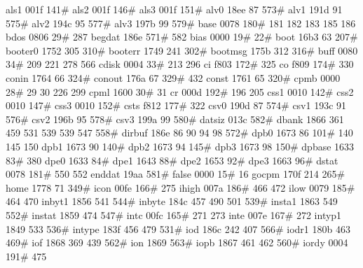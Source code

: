 als1            001f    141#
als2            001f    146#
als3            001f    151#
alv0            18ee     87     573#
alv1            191d     91     575#
alv2            194c     95     577#
alv3            197b     99     579#
base            0078    180#    181     182     183    185    186
bdos            0806     29#    287 
begdat          186e    571#    582
bias            0000     19#     22#
boot            16b3     63     207#
booter0         1752    305     310#
booterr         1749    241     302#
bootmsg         175b    312     316#
buff            0080     34#    209     221     278     566
cdisk           0004     33#    213     296
ci              f803    172#    325
co              f809    174#    330
conin           1764     66     324#
conout          176a     67     329#    432
const           1761     65     320#
cpmb            0000     28#     29      30     226     299
cpml            1600     30#     31
cr              000d    192#    196     205
css1            0010    142#
css2            0010    147#
css3            0010    152#
csts            f812    177#    322
csv0            190d     87     574#
csv1            193c     91     576#
csv2            196b     95     578#
csv3            199a     99     580#
datsiz          013c    582#
dbank           1866    361     459     531     539     539     547     558#
dirbuf          186e     86      90      94      98     572#
dpb0            1673     86     101#    140     145     150
dpb1            1673     90     140#
dpb2            1673     94     145#
dpb3            1673     98     150#
dpbase          1633     83#    380
dpe0            1633     84#
dpe1            1643     88#
dpe2            1653     92#
dpe3            1663     96#
dstat           0078    181#    550     552
enddat          19aa    581#
false           0000     15#     16
gocpm           170f    214     265#
home            1778     71     349#
icon            00fe    166#    275
ihigh           007a    186#    466     472
ilow            0079    185#    464     470
inbyt1          1856    541     544#
inbyte          184c    457     490     501     539#
insta1          1863    549     552#
instat          1859    474     547#
intc            00fc    165#    271     273
inte            007e    167#    272
intyp1          1849    533     536#
intype          183f    456     479     531#
iod             186c    242     407     566#
iodr1           180b    463     469#
iof             1868    369     439     562#
ion             1869    563#
iopb            1867    461     462     560#
iordy           0004    191#    475
